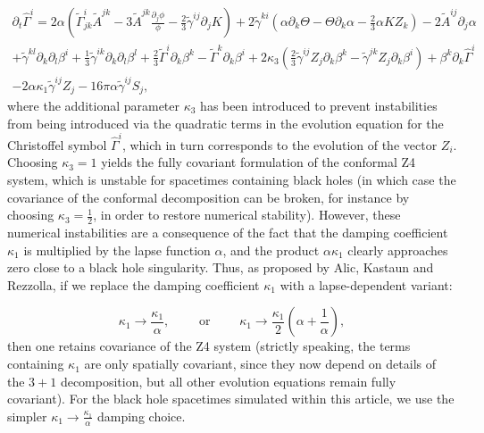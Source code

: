 \documentclass{article}
\begin{document}
\begin{multline}
\partial_t \hat{\Gamma}^i = 2 \alpha \left( \tilde{\Gamma}_{j k}^{i} \tilde{A}^{j k} - 3 \tilde{A}^{j k} \frac{\partial_j \phi}{\phi} - \frac{2}{3} \tilde{\gamma}^{i j} \partial_j K \right) + 2 \tilde{\gamma}^{k i} \left( \alpha \partial_k \Theta - \Theta \partial_k \alpha - \frac{2}{3} \alpha K Z_k \right) - 2 \tilde{A}^{i j} \partial_j \alpha\\
+ \tilde{\gamma}^{k l} \partial_k \partial_l \beta^i + \frac{1}{3} \tilde{\gamma}^{i k} \partial_k \partial_l \beta^l + \frac{2}{3} \tilde{\Gamma}^i \partial_k \beta^k - \tilde{\Gamma}^k \partial_k \beta^i + 2 \kappa_3 \left( \frac{2}{3} \tilde{\gamma}^{i j} Z_j \partial_k \beta^k - \tilde{\gamma}^{j k} Z_j \partial_k \beta^i \right) + \beta^k \partial_k \hat{\Gamma}^i\\
-2 \alpha \kappa_1 \tilde{\gamma}^{i j} Z_j - 16 \pi \alpha \tilde{\gamma}^{i j} S_j,
\end{multline}
where the additional parameter ${\kappa_3}$ has been introduced to prevent instabilities from being introduced via the quadratic terms in the evolution equation for the Christoffel symbol ${\hat{\Gamma}^i}$, which in turn corresponds to the evolution of the vector ${Z_i}$. Choosing ${\kappa_3 = 1}$ yields the fully covariant formulation of the conformal Z4 system, which is unstable for spacetimes containing black holes (in which case the covariance of the conformal decomposition can be broken, for instance by choosing ${\kappa_3 = \frac{1}{2}}$, in order to restore numerical stability). However, these numerical instabilities are a consequence of the fact that the damping coefficient ${\kappa_1}$ is multiplied by the lapse function ${\alpha}$, and the product ${\alpha \kappa_1}$ clearly approaches zero close to a black hole singularity. Thus, as proposed by Alic, Kastaun and Rezzolla\cite{alic2}, if we replace the damping coefficient ${\kappa_1}$ with a lapse-dependent variant:

\begin{equation}
\kappa_1 \to \frac{\kappa_1}{\alpha}, \qquad \text{ or } \qquad \kappa_1 \to \frac{\kappa_1}{2} \left( \alpha + \frac{1}{\alpha} \right),
\end{equation}
then one retains covariance of the Z4 system (strictly speaking, the terms containing ${\kappa_1}$ are only spatially covariant, since they now depend on details of the ${3 + 1}$ decomposition, but all other evolution equations remain fully covariant). For the black hole spacetimes simulated within this article, we use the simpler ${\kappa_1 \to \frac{\kappa_1}{\alpha}}$ damping choice.
\end{document}
